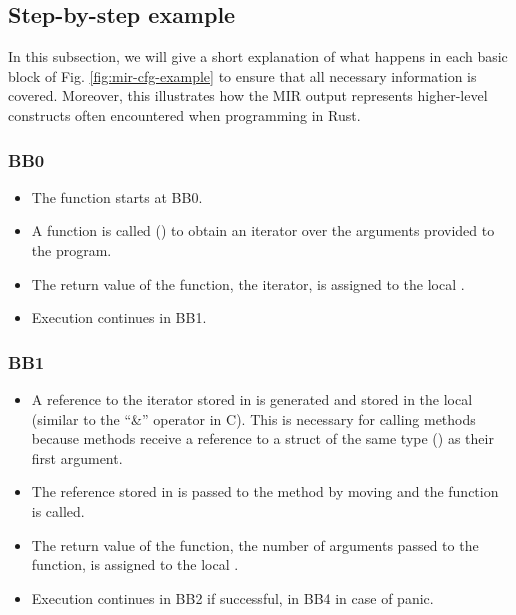 \subsection{Step-by-step example}

In this subsection, we will give a short explanation of what happens
in each basic block of Fig. \ref{fig:mir-cfg-example}
to ensure that all necessary information is covered.
Moreover, this illustrates how the \acrshort{MIR} output represents higher-level constructs
often encountered when programming in Rust.

\subsubsection{BB0}

\begin{itemize}
    \item The  function starts at BB0.
    \item A function is called ()
          to obtain an iterator over the arguments provided to the program.
    \item The return value of the function, the iterator,
          is assigned to the local .
    \item Execution continues in BB1.
\end{itemize}

\subsubsection{BB1}

\begin{itemize}
    \item A reference to the iterator stored in  is generated
          and stored in the local  (similar to the ``\&'' operator in C).
          This is necessary for calling methods
          because methods receive a reference
          to a struct of the same type () as their first argument.
    \item The reference stored in  is passed to
          the method  by moving
          and the function is called.
    \item The return value of the function,
          the number of arguments passed to the function, is assigned to the local .
    \item Execution continues in BB2 if successful, in BB4 in case of panic.
\end{itemize}


